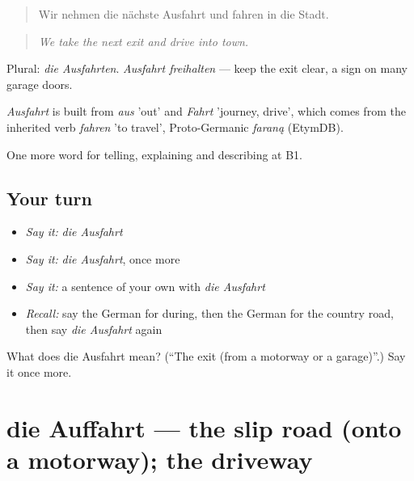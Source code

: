 \begin{quote}
Wir nehmen die nächste Ausfahrt und fahren in die Stadt.
\end{quote}

\begin{quote}
\emph{We take the next exit and drive into town.}
\end{quote}

Plural: \emph{die Ausfahrten}. \emph{Ausfahrt freihalten} — keep the exit clear, a sign on many garage doors.

\begin{cousinweb}
\emph{Ausfahrt} is built from \emph{aus} 'out' and \emph{Fahrt} 'journey, drive', which comes from the inherited verb \emph{fahren} 'to travel', Proto-Germanic \emph{faraną} (EtymDB).
\end{cousinweb}

\begin{grammarlens}[title={What you've built}]
One more word for telling, explaining and describing at B1.
\end{grammarlens}

\subsection*{Your turn}
\begin{itemize}
\raggedright
  \item \emph{Say it:} \emph{die Ausfahrt}
  \item \emph{Say it:} \emph{die Ausfahrt}, once more
  \item \emph{Say it:} a sentence of your own with \emph{die Ausfahrt}
  \item \emph{Recall:} say the German for during, then the German for the country road, then say \emph{die Ausfahrt} again
\end{itemize}

\begin{tcolorbox}[breakable,colback=teal!4,colframe=teal!35!black,title={Before you move on}]
What does die Ausfahrt mean? (\textquotedblleft{}The exit (from a motorway or a garage)\textquotedblright{}.) Say it once more.
\end{tcolorbox}
\section[die Auffahrt]{die Auffahrt — the slip road (onto a motorway); the driveway}

\label{lesson:GE-C398-auffahrt}



